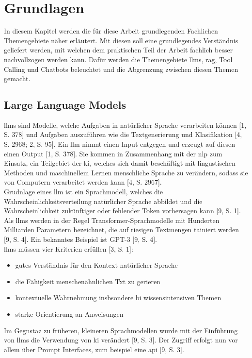 \chapter{Grundlagen}\label{ch:grundlagen}

In diesem Kapitel werden die für diese Arbeit grundlegenden Fachlichen Themengebiete näher erläutert. Mit diesen soll eine grundlegendes Verständnis geliefert 
werden, mit welchen dem praktischen Teil der Arbeit fachlich besser nachvollzogen werden kann. Dafür werden die Themengebiete \acp{llm}, \ac{rag}, Tool Calling 
und Chatbots beleuchtet und die Abgrenzung zwischen diesen Themen gemacht.

\section{Large Language Models}

\acp{llm} sind Modelle, welche Aufgaben in natürlicher Sprache verarbeiten können [1, S. 378] und Aufgaben auszuführen wie die Textgenerierung und
Klasifikation [4, S. 2968; 2, S. 95]. Ein \ac{llm} nimmt einen Input entgegen und erzeugt auf diesen 
einen Output [1, S. 378]. Sie kommen in Zusammenhang mit der \ac{nlp} zum Einsatz, ein Teilgebiet der \ac{ki}, welches sich damit beschäftigt mit lingustischen 
Methoden und maschinellem Lernen menschliche Sprache zu verändern, sodass sie von Computern verarbeitet werden kann [4, S. 2967]. \\
Grudnlage eines \ac{llm} ist ein Sprachmodell, welches die Wahrscheinlichkeitsverteilung natürlicher Sprache abbildet und die Wahrscheinlichkeit zukünftiger oder 
fehlender Token vorhersagen kann [9, S. 1]. Als \acp{llm} werden in der Regel Transformer-Sprachmodelle mit Hunderten Milliarden Parametern bezeichnet, die auf 
riesigen Textmengen tainiert werden [9, S. 4]. Ein bekanntes Beispiel ist GPT-3 [9, S. 4]. \\
\acp{llm} müssen vier Kriterien erfüllen [3, S. 1]:

\begin{itemize}
  \item gutes Verständnis für den Kontext natürlicher Sprache
  \item die Fähigkeit menschenähnlichen Txt zu gerieren
  \item kontextuelle Wahrnehmung insbsondere bi wissensintensiven Themen
  \item starke Orientierung an Anweisungen
\end{itemize}

Im Gegnstaz zu früheren, kleineren Sprachmodellen wurde mit der Einführung von \acp{llm} die Verwendung von \ac{ki} verändert [9, S. 3]. Der Zugriff erfolgt nun vor 
allem über Prompt Interfaces, zum beispiel eine \ac{api} [9, S. 3]. 

